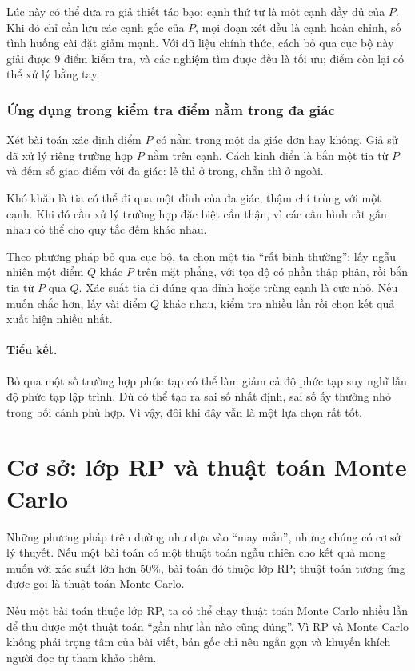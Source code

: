 \documentclass[11pt]{article}
\begin{document}
Lúc này có thể đưa ra giả thiết táo bạo: cạnh thứ tư là một cạnh đầy đủ của
$P$. Khi đó chỉ cần lưu các cạnh gốc của $P$, mọi đoạn xét đều là cạnh hoàn
chỉnh, số tình huống cài đặt giảm mạnh. Với dữ liệu chính thức, cách bỏ qua
cục bộ này giải được $9$ điểm kiểm tra, và các nghiệm tìm được đều là tối ưu;
điểm còn lại có thể xử lý bằng tay.

\subsubsection{Ứng dụng trong kiểm tra điểm nằm trong đa giác}

Xét bài toán xác định điểm $P$ có nằm trong một đa giác đơn hay không. Giả sử
đã xử lý riêng trường hợp $P$ nằm trên cạnh. Cách kinh điển là bắn một tia từ
$P$ và đếm số giao điểm với đa giác: lẻ thì ở trong, chẵn thì ở ngoài.

Khó khăn là tia có thể đi qua một đỉnh của đa giác, thậm chí trùng với một
cạnh. Khi đó cần xử lý trường hợp đặc biệt cẩn thận, vì các cấu hình rất gần
nhau có thể cho quy tắc đếm khác nhau.

Theo phương pháp bỏ qua cục bộ, ta chọn một tia ``rất bình thường'': lấy ngẫu
nhiên một điểm $Q$ khác $P$ trên mặt phẳng, với tọa độ có phần thập phân, rồi
bắn tia từ $P$ qua $Q$. Xác suất tia đi đúng qua đỉnh hoặc trùng cạnh là cực
nhỏ. Nếu muốn chắc hơn, lấy vài điểm $Q$ khác nhau, kiểm tra nhiều lần rồi
chọn kết quả xuất hiện nhiều nhất.

\paragraph{Tiểu kết.}
Bỏ qua một số trường hợp phức tạp có thể làm giảm cả độ phức tạp suy nghĩ lẫn
độ phức tạp lập trình. Dù có thể tạo ra sai số nhất định, sai số ấy thường nhỏ
trong bối cảnh phù hợp. Vì vậy, đôi khi đây vẫn là một lựa chọn rất tốt.

\section{Cơ sở: lớp RP và thuật toán Monte Carlo}

Những phương pháp trên dường như dựa vào ``may mắn'', nhưng chúng có cơ sở
lý thuyết. Nếu một bài toán có một thuật toán ngẫu nhiên cho kết quả mong muốn
với xác suất lớn hơn $50\%$, bài toán đó thuộc lớp RP; thuật toán tương ứng
được gọi là thuật toán Monte Carlo.

Nếu một bài toán thuộc lớp RP, ta có thể chạy thuật toán Monte Carlo nhiều lần
để thu được một thuật toán ``gần như lần nào cũng đúng''. Vì RP và Monte Carlo
không phải trọng tâm của bài viết, bản gốc chỉ nêu ngắn gọn và khuyến khích
người đọc tự tham khảo thêm.
\end{document}
